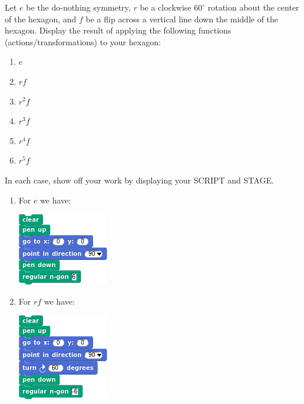 \documentclass[noauthor,nooutcomes,hints,handout]{ximera}
\begin{document}
\begin{question}
  Let $e$ be the do-nothing symmetry, $r$ be a clockwise $60^\circ$
  rotation about the center of the hexagon, and $f$ be a flip across a
  vertical line down the middle of the hexagon. Display the result of
  applying the following functions (actions/transformations) to your
  hexagon:
  \begin{enumerate}
  \item $e$
  \item $rf$
  \item $r^2 f$
  \item $r^3 f$
  \item $r^4 f$
  \item $r^5 f$
  \end{enumerate}
  In each case, show off your work by displaying your SCRIPT and
  STAGE.
  \begin{freeResponse}
    \begin{enumerate}
    \item For $e$ we have:
      \begin{center}
        \includegraphics[width=.3\textwidth]{eHexSCRIPT.png}   \qquad {}
      \end{center}
    \item For $rf$ we have:
      \begin{center}
        \includegraphics[width=.3\textwidth]{rfHexSCRIPT.png}   \qquad {}

\end{center}
\end{enumerate}
\end{freeResponse}
\end{question}
\end{document}
